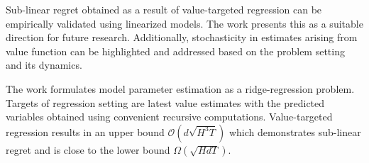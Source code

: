 \documentclass[12pt,letterpaper]{article}
\begin{document}
Sub-linear regret obtained as a result of value-targeted regression can be empirically validated using linearized models. The work presents this as a suitable direction for future research. Additionally, stochasticity in estimates arising from value function can be highlighted and addressed based on the problem setting and its dynamics. 

The work formulates model parameter estimation as a ridge-regression problem. Targets of regression setting are latest value estimates with the predicted variables obtained using convenient recursive computations. Value-targeted regression results in an upper bound $\mathcal{O}(d\sqrt{H^{3}T})$ which demonstrates sub-linear regret and is close to the lower bound $\Omega(\sqrt{HdT})$. 
\end{document}
